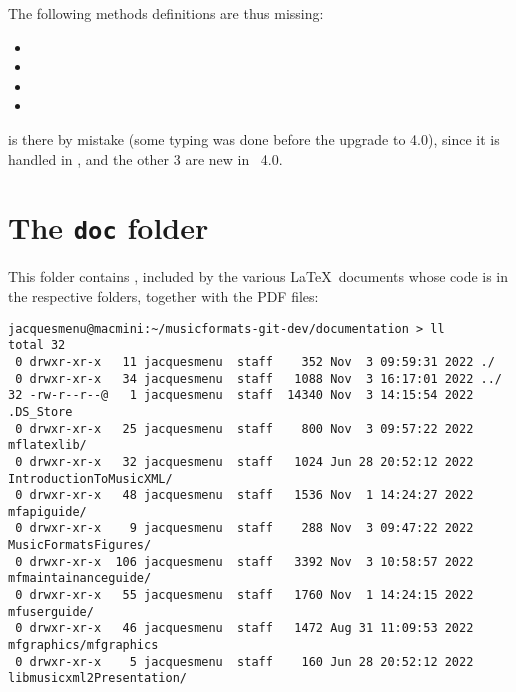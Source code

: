 The following methods definitions are thus missing:
\begin{itemize}
\item  {}
\item  {}
 \item {}
\item  {}
\end{itemize}

 is there by mistake (some typing was done before the upgrade to 4.0), since it is handled in , and the other 3 are new in \mxml\ 4.0.



\section{The {\tt doc} folder}

This folder contains , included by the various \LaTeX\ documents whose code is in the respective folders, together with the PDF files:
\begin{lstlisting}[language=Terminal]
jacquesmenu@macmini:~/musicformats-git-dev/documentation > ll
total 32
 0 drwxr-xr-x   11 jacquesmenu  staff    352 Nov  3 09:59:31 2022 ./
 0 drwxr-xr-x   34 jacquesmenu  staff   1088 Nov  3 16:17:01 2022 ../
32 -rw-r--r--@   1 jacquesmenu  staff  14340 Nov  3 14:15:54 2022 .DS_Store
 0 drwxr-xr-x   25 jacquesmenu  staff    800 Nov  3 09:57:22 2022 mflatexlib/
 0 drwxr-xr-x   32 jacquesmenu  staff   1024 Jun 28 20:52:12 2022 IntroductionToMusicXML/
 0 drwxr-xr-x   48 jacquesmenu  staff   1536 Nov  1 14:24:27 2022 mfapiguide/
 0 drwxr-xr-x    9 jacquesmenu  staff    288 Nov  3 09:47:22 2022 MusicFormatsFigures/
 0 drwxr-xr-x  106 jacquesmenu  staff   3392 Nov  3 10:58:57 2022 mfmaintainanceguide/
 0 drwxr-xr-x   55 jacquesmenu  staff   1760 Nov  1 14:24:15 2022 mfuserguide/
 0 drwxr-xr-x   46 jacquesmenu  staff   1472 Aug 31 11:09:53 2022 mfgraphics/mfgraphics
 0 drwxr-xr-x    5 jacquesmenu  staff    160 Jun 28 20:52:12 2022 libmusicxml2Presentation/
\end{lstlisting}

